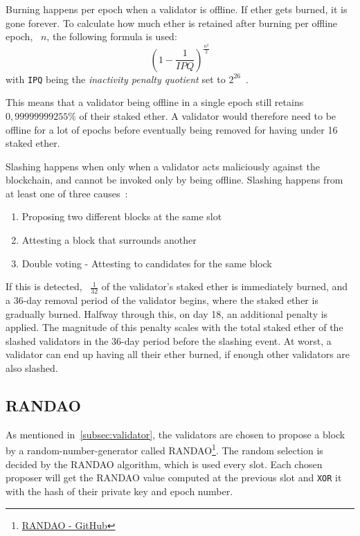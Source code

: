 Burning happens per epoch when a validator is offline.
If ether gets burned, it is gone forever.
To calculate how much ether is retained after burning per offline epoch, ~$n$, the following formula is used:
\begin{equation}
    \left(1-\frac{1}{IPQ}\right)^\frac{n^2}{2}
    \label{eq:burn}
\end{equation}
with \texttt{IPQ} being the \textit{inactivity penalty quotient} set to $2^{26}$~\cite{consensus-spec-phase-0}.


This means that a validator being offline in a single epoch still retains $0,99999999255\%$ of their staked ether\@.
A validator would therefore need
to be offline for a lot of epochs before eventually being removed for having under 16 staked ether\@.


Slashing happens when only when a validator acts maliciously against the blockchain,
and cannot be invoked only by being offline.
Slashing happens from at least one of three causes~\cite{PoSRewAndPen}:
\begin{enumerate}
    \item Proposing two different blocks at the same slot
    \item Attesting a block that surrounds another
    \item Double voting - Attesting to candidates for the same block
\end{enumerate}
If this is detected, ~$\frac{1}{32}$ of the validator's staked ether is immediately burned,
and a 36-day removal period of the validator begins, where the staked ether is gradually burned.
Halfway through this, on day 18, an additional penalty is applied.
The magnitude of this penalty scales with the total staked ether of the slashed validators in the 36-day period before the slashing event.
At worst, a validator can end up having all their ether burned, if enough other validators are also slashed.

\subsection{RANDAO}\label{subsec:randao}
As mentioned in~\autoref{subsec:validator}, the validators are chosen to propose a block by a random-number-generator called RANDAO\footnote{\href{https://github.com/randao/randao}{RANDAO - GitHub}}.
The random selection is decided by the RANDAO algorithm, which is used every slot.
Each chosen proposer will get the RANDAO value computed at the previous slot and \texttt{XOR} it with the hash of their private key and epoch number.


